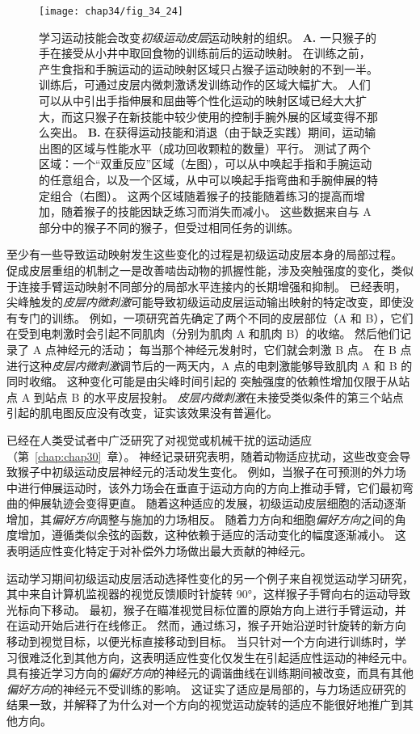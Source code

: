 \begin{figure}[htbp]
	\centering
	\texttt{[image: chap34/fig\_34\_24]}
	\caption{学习运动技能会改变\textit{初级运动皮层}运动映射的组织\cite{nudo1996use}。
		\textbf{A.} 一只猴子的手在接受从小井中取回食物的训练前后的运动映射。
		在训练之前，产生食指和手腕运动的运动映射区域只占猴子运动映射的不到一半。
		训练后，可通过皮层内微刺激诱发训练动作的区域大幅扩大。
		人们可以从中引出手指伸展和屈曲等个性化运动的映射区域已经大大扩大，而这只猴子在新技能中较少使用的控制手腕外展的区域变得不那么突出。
		\textbf{B.} 在获得运动技能和消退（由于缺乏实践）期间，运动输出图的区域与性能水平（成功回收颗粒的数量）平行。
		测试了两个区域：一个“双重反应”区域（左图），可以从中唤起手指和手腕运动的任意组合，以及一个区域，从中可以唤起手指弯曲和手腕伸展的特定组合（右图）。
		这两个区域随着猴子的技能随着练习的提高而增加，随着猴子的技能因缺乏练习而消失而减小。
		这些数据来自与 A 部分中的猴子不同的猴子，但受过相同任务的训练。}
	\label{fig:34_24}
\end{figure}


至少有一些导致运动映射发生这些变化的过程是初级运动皮层本身的局部过程。
促成皮层重组的机制之一是改善啮齿动物的抓握性能，涉及突触强度的变化，类似于连接手臂运动映射不同部分的局部水平连接内的长期增强和抑制。
已经表明，尖峰触发的\textit{皮层内微刺激}可能导致初级运动皮层运动输出映射的特定改变，即使没有专门的训练。
例如，一项研究首先确定了两个不同的皮层部位（A 和 B），它们在受到电刺激时会引起不同肌肉（分别为肌肉 A 和肌肉 B）的收缩。
然后他们记录了 A 点神经元的活动； 每当那个神经元发射时，它们就会刺激 B 点。
在 B 点进行这种\textit{皮层内微刺激}调节后的一两天内，A 点的电刺激能够导致肌肉 A 和 B 的同时收缩。
这种变化可能是由尖峰时间引起的 突触强度的依赖性增加仅限于从站点 A 到站点 B 的水平皮层投射。
\textit{皮层内微刺激}在未接受类似条件的第三个站点引起的肌电图反应没有改变，证实该效果没有普遍化。


已经在人类受试者中广泛研究了对视觉或机械干扰的运动适应（第~\ref{chap:chap30}~章）。
神经记录研究表明，随着动物适应扰动，这些改变会导致猴子中初级运动皮层神经元的活动发生变化。
例如，当猴子在可预测的外力场中进行伸展运动时，该外力场会在垂直于运动方向的方向上推动手臂，它们最初弯曲的伸展轨迹会变得更直。
随着这种适应的发展，初级运动皮层细胞的活动逐渐增加，其\textit{偏好方向}调整与施加的力场相反。
随着力方向和细胞\textit{偏好方向}之间的角度增加，遵循类似余弦的函数，这种依赖于适应的活动变化的幅度逐渐减小。
这表明适应性变化特定于对补偿外力场做出最大贡献的神经元。


运动学习期间初级运动皮层活动选择性变化的另一个例子来自视觉运动学习研究，其中来自计算机监视器的视觉反馈顺时针旋转 90°，这样猴子手臂向右的运动导致光标向下移动。
最初，猴子在瞄准视觉目标位置的原始方向上进行手臂运动，并在运动开始后进行在线修正。
然而，通过练习，猴子开始沿逆时针旋转的新方向移动到视觉目标，以便光标直接移动到目标。
当只针对一个方向进行训练时，学习很难泛化到其他方向，这表明适应性变化仅发生在引起适应性运动的神经元中。
具有接近学习方向的\textit{偏好方向}的神经元的调谐曲线在训练期间被改变，而具有其他\textit{偏好方向}的神经元不受训练的影响。
这证实了适应是局部的，与力场适应研究的结果一致，并解释了为什么对一个方向的视觉运动旋转的适应不能很好地推广到其他方向。


